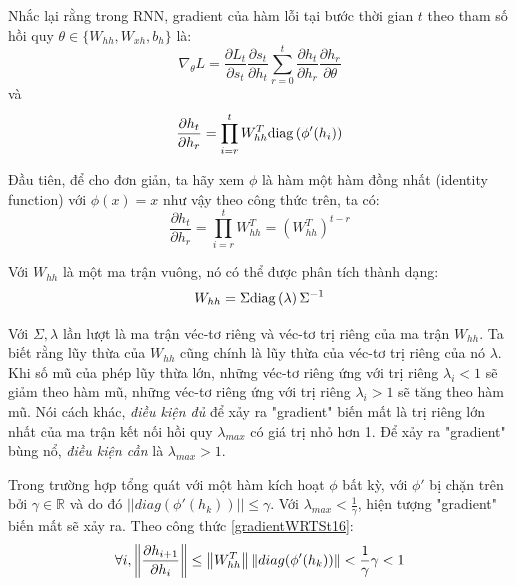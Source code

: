 Nhắc lại rằng trong RNN, gradient của hàm lỗi tại bước thời gian $t$ theo tham số hồi quy $\theta  \in \{W_{hh}, W_{xh}, b_h \}$ là:
\begin{equation} \label{beginGradientVanish0}
	\nabla_{\theta}L = \frac{\partial L_t}{\partial s_t} \frac{\partial s_t}{\partial h_t} \sum_{r=0}^{t}  \frac{\partial h_t}{\partial h_r}\frac{\partial h_r}{\partial \theta}
\end{equation}
và 
\begin{equation} \label{beginGradientVanish1}
	\frac{\partial h_t}{\partial h_r} = \prod_{i=r}^{t} W_{hh}^T \mathrm{diag} \left( \phi'(h_i) \right)
\end{equation}

Đầu tiên, để cho đơn giản, ta hãy xem $\phi$ là hàm một hàm đồng nhất (identity function) với $\phi(x) = x$ như vậy theo công thức trên, ta có:
\begin{equation} \label{gradientVanish3}
	\frac{\partial h_t}{\partial h_r} = \prod_{i=r}^{t} W_{hh}^T = \left (W_{hh}^T \right)^{t-r}
\end{equation}

Với $W_{hh}$ là một ma trận vuông, nó có thể được phân tích thành dạng:
\begin{equation} \label{gradientVanish4}
	W_{hh} = \Sigma \mathrm{diag} \left(\lambda \right) \Sigma^{-1} 
\end{equation}

Với $\Sigma, \lambda$ lần lượt là ma trận véc-tơ riêng và véc-tơ trị riêng của ma trận $W_{hh}$. Ta biết rằng lũy thừa của $W_{hh}$ cũng chính là lũy thừa của véc-tơ trị riêng của nó $\lambda$. Khi số mũ của phép lũy thừa lớn, những véc-tơ riêng ứng với trị riêng $\lambda_i < 1$ sẽ giảm theo hàm mũ, những véc-tơ riêng ứng với trị riêng $\lambda_i > 1$ sẽ tăng theo hàm mũ. Nói cách khác, \textit{điều kiện đủ} để xảy ra "gradient" biến mất là trị riêng lớn nhất của ma trận kết nối hồi quy $\lambda_{max}$ có giá trị nhỏ hơn 1. Để xảy ra "gradient" bùng nổ, \textit{điều kiện cần} là $\lambda_{max} > 1$.

Trong trường hợp tổng quát với một hàm kích hoạt $\phi$ bất kỳ, với $\phi'$ bị chặn trên bởi $\gamma \in \mathbb{R}$ và do đó $||diag(\phi'(h_k))|| \leq \gamma$. Với $\lambda_{max} < \frac{1}{\gamma}$, hiện tượng "gradient" biến mất sẽ xảy ra. Theo công thức \ref{gradientWRTSt16}:
\begin{equation} \label{gradientVanish5}
	\forall i, \left\lVert\frac{\partial h_{i+1}}{\partial h_{i}}\right\rVert \leq \left\lVert W^T_{hh} \right\rVert \left\lVert diag(\phi'(h_k)) \right\rVert < \frac{1}{\gamma} \gamma < 1 
\end{equation}

